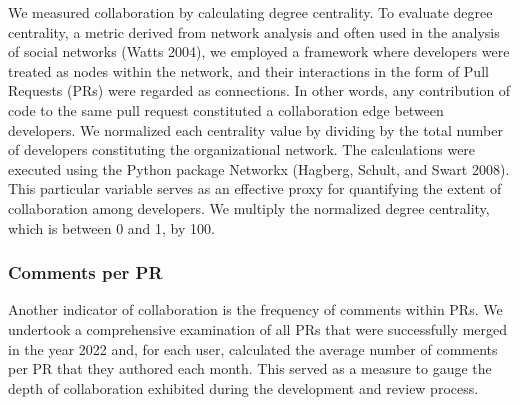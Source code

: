\documentclass[
]{article}
\begin{document}
We measured collaboration by calculating degree centrality. To evaluate
degree centrality, a metric derived from network analysis and often used
in the analysis of social networks (Watts 2004), we employed a framework
where developers were treated as nodes within the network, and their
interactions in the form of Pull Requests (PRs) were regarded as
connections. In other words, any contribution of code to the same pull
request constituted a collaboration edge between developers. We
normalized each centrality value by dividing by the total number of
developers constituting the organizational network. The calculations
were executed using the Python package Networkx (Hagberg, Schult, and
Swart 2008). This particular variable serves as an effective proxy for
quantifying the extent of collaboration among developers. We multiply
the normalized degree centrality, which is between 0 and 1, by 100.

\subsubsection{Comments per PR}\label{comments-per-pr}

Another indicator of collaboration is the frequency of comments within
PRs. We undertook a comprehensive examination of all PRs that were
successfully merged in the year 2022 and, for each user, calculated the
average number of comments per PR that they authored each month. This
served as a measure to gauge the depth of collaboration exhibited during
the development and review process.
\end{document}
